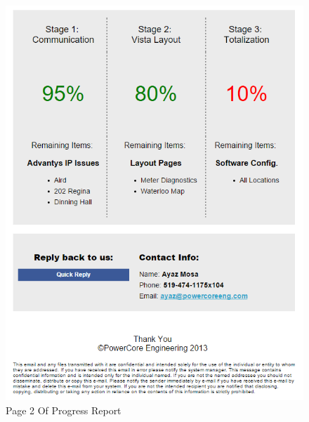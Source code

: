 \begin{figure}
		
		\begin{center}
		\includegraphics[width=5in, keepaspectratio=true]{../Images/ProgressReport2.PNG}
		\end{center}
	\caption{Page 2 Of Progress Report}
	\label{fig:Page2OfProgressReport}
\end{figure}



